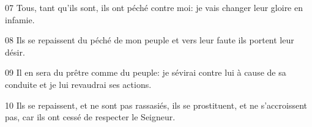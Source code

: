 
07 Tous, tant qu’ils sont, ils ont péché contre moi: je vais changer leur gloire en infamie.

08 Ils se repaissent du péché de mon peuple et vers leur faute ils portent leur désir.

09 Il en sera du prêtre comme du peuple: je sévirai contre lui à cause de sa conduite et je lui revaudrai ses actions.

10 Ils se repaissent, et ne sont pas rassasiés, ils se prostituent, et ne s’accroissent pas, car ils ont cessé de respecter le Seigneur.